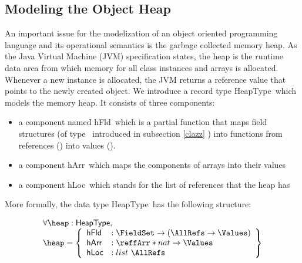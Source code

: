  \newcommand{\HeapSet}{\mbox{\rm \textsf{HeapType}}}
 \newcommand{\heapFields}{\mbox{\rm \textsf{hFld}}}
 \newcommand{\heapArrays}{\mbox{\rm \textsf{hArr}}}
 \newcommand{\heapLocs}{\mbox{\rm \textsf{hLoc}}}

 \subsection{Modeling the Object Heap} \label{heap}
 An important issue for the modelization of an object oriented programming language and its operational semantics
 is the garbage collected memory heap. As the Java Virtual Machine (JVM) specification states, the heap is the
 runtime data area from which memory  for all class instances and arrays is allocated. Whenever a new instance
 is allocated, the JVM returns a reference value that points to the newly created object. 
 We introduce a record type \HeapSet \ which models the memory heap.
 It consists of three components:
 \begin{itemize}
       \item a component  named \heapFields \ which is a partial function that maps field
             structures (of type \FieldSet \ introduced in subsection \ref{clazz} ) into functions from references (\AllRefs)
	     into values (\Values).  
 

       \item  a component \heapArrays \ which maps the components of arrays  into their values

        \item  a component  \heapLocs  \ which stands for the  list of references that the heap has 
 \end{itemize}

 More formally, the data type \HeapSet \ has the following structure:



  $$ \begin{array}{l}
         \forall  \heap : \HeapSet , \\
         \heap = \left\{\begin{array}{ll}  \heapFields &  : \FieldSet \rightarrow (\AllRefs \rightarrow \Values) \\
                                           \heapArrays &  : \reffArr * nat \rightarrow \Values \\
					   \heapLocs   &  : list \ \AllRefs
                    \end{array} \right\}
   \end{array} $$




